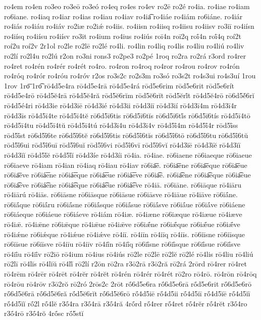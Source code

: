 {ro4em
ro4en
ro3eo
ro3eō
ro3eó
ro4eq
ro4es
ro4ev
ro2ē
ro2é
ro4ia.
ro4iae
ro4iam
ro6iane.
ro4iaq
ro4iar
ro4ias
ro4iau
ro4iav
ro4ia͡
ro4iáe
ro4iám
ro6iáne.
ro4iár
ro4iás
ro4iáu
ro4iáv
ro2iæ
ro2iǽ
ro4iis.
ro4iisn
ro4iisq
ro4iisu
ro4iisv
ro3iī
ro4iísn
ro4iísq
ro4iísu
ro4iísv
ro3it
ro4ium
ro4ius
ro4iús
roī4n
roī2q
roī́4n
roī́4q
roí2t
roí2u
roí2v
2r1ol
ro2le
ro2lē
ro2lé
ro4li.
ro4lin
ro4liq
ro4lis
ro4liu
ro4liú
ro4liv
ro2lí
ro2l4u
ro2lú
r2on
ro3ni
rons3
ro2pe3
ro2pé
1roq
ro2ra
ro2rá
r3ord
ro4rer
ro4ret
ro4rén
ro4rér
ro4rét
ro4ro.
ro4ron
ro4roq
ro4ror
ro4rou
ro4rov
ro4rón
ro4róq
ro4rór
ro4róu
ro4róv
r2os
ro3s2c
ro2s3m
ro3só
ro3s2t
ro4s3ui
ro4s3uí
1rou
1rov
1ro͞
1ro͡
rō4d5e4ra
rō4d5e4rā
rō4d5e4rá
rōd5e6rim
rōd5e6rit
rōd5e6rít
rō4d5e4rō
rō4d5ĕ4rā
rō4d5ĕ4ră
rōd5ĕ6rĭm
rōd5ĕ6rĭt
rōd5ĕrĭ́t
rō4d5ĕ4rō
rō6d5ĕ́6rĭ
rō4d5é4ri
rō4d3ie
rō4d3iē
rō4d3ié
rō4d3ii
rō4d3iī
rō4d3ií
rō4d3ī4m
rō4d3ī4r
rō4d3īs
rō4d5ī4te
rō4d5ī4tĕ
rō6d5ī6tis
rō6d5ī6tĭs
rō6d5ī6tĭ́s
rō6d5ī6tís
rō4d5ī4tō
rō4d5ī4tu
rō4d5ī4tŭ
rō4d5ī4tú
rō4d3ī4u
rō4d3ī4v
rō4d5ī́4m
rō4d5ī́4r
rōd5ī́ss
rōd5ī́st
rō6d5ī́6te
rō6d5ī́6tĕ
rō6d5ī́6tis
rō6d5ī́6tĭs
rō6d5ī́6tō
rō6d5ī́6tu
rō6d5ī́6tŭ
rōd5ī́6ui
rōd5ī́6uī
rōd5ī́6uĭ
rōd5ī́6vi
rōd5ī́6vī
rōd5ī́6vĭ
rō4d3ĭē
rō4d3ĭĕ
rō4d3ĭī
rō4d3ĭĭ
rō4d5ĭ́ĕ
rō4d5ĭ́ĭ
rō4d3íe
rō4d3íi
rō4ia.
rō4iae.
rō6iaene
rō6iaeque
rō6iaeue
rō6iaeve
rō4iam
rō4ian
rō4iaq
rō4iau
rō4iav
rō6ia͞e.
rō6ia͞ene
rō6ia͞eque
rō6ia͞eue
rō6ia͞eve
rō6iá͞ene
rō6iá͞eque
rō6iá͞eue
rō6iá͞eve
rō6ia͡e.
rō6ia͡ene
rō6ia͡eque
rō6ia͡eue
rō6ia͡eve
rō6iá͡ene
rō6iá͡eque
rō6iá͡eue
rō6iá͡eve
rō4iā.
rō6iāne.
rō6iāque
rō4iāru
rō4iārú
rō4iās.
rō6iāsne
rō6iāsque
rō6iāsue
rō6iāsve
rō4iāue
rō4iāve
rō6iā́ne.
rō6iā́que
rō6iā́ru
rō6iā́sne
rō6iā́sque
rō6iā́sue
rō6iā́sve
rō6iā́ue
rō6iā́ve
rō6iáene
rō6iáeque
rō6iáeue
rō6iáeve
rō4iám
rō4iæ.
rō4iæne
rō6iæque
rō4iæue
rō4iæve
rō4iǣ.
rō4iǣne
rō6iǣque
rō4iǣue
rō4iǣve
rō6iǣ́ne
rō6iǣ́que
rō6iǣ́ue
rō6iǣ́ve
rō4iǽne
rō6iǽque
rō4iǽue
rō4iǽve
rō4iī.
rō4iīn
rō4iīq
rō4iīs.
rō6iīsne
rō6iīsque
rō6iīsue
rō6iīsve
rō4iīu
rō4iīv
rō4iī́n
rō4iī́q
rō6iī́sne
rō6iī́sque
rō6iī́sue
rō6iī́sve
rō4iī́u
rō4iī́v
rō2iō
rō4ium
rō4ius
rō4iús
rō2le
rō2lē
rō2lĕ
rō2lé
rō4lis
rō4liu
rō4liú
rō2lī
rō4lĭs
rō4lĭŭ
rō4lĭ́
rō2lí
r2ōn
rō2ra
r3ō2rā
r3ō2ră
rō2rá
2rōrd
rō4rer
rō4ret
rō4rēm
rō4rēr
rō4rēt
rō4rĕr
rō4rĕt
rō4rén
rō4rér
rō4rét
rō2ro
rō4rō.
rō4rōn
rō4rōq
rō4rōu
rō4rōv
r3ō2rŏ
rō2ró
2rōs2c
2rōt
rṓ6d5e6ra
rṓ6d5e6rā
rṓd5e6rit
rṓ6d5e6rō
rṓ6d5ĕ6rā
rṓ6d5ĕ6ră
rṓd5ĕ6rĭt
rṓ6d5ĕ6rō
rṓ4d5iē
rṓ4d5ii
rṓ4d5iī
rṓ4d5ĭē
rṓ4d5ĭī
rṓ4d5ĭĭ
rṓ2l
rṓ4lĕ
r3ṓ4ra
r3ṓ4rā
r3ṓ4ră
4rṓrd
rṓ4rer
rṓ4ret
rṓ4rĕr
rṓ4rĕt
r3ṓ4ro
r3ṓ4rō
r3ṓ4rŏ
4rṓsc
rṓ5stĭ
}
